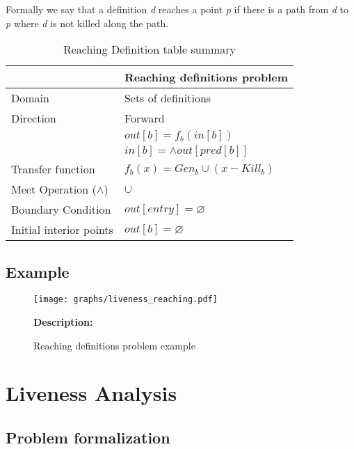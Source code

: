 \documentclass{article}
\begin{document}
Formally we say that a definition \textit{d} reaches a point \textit{p} if there is a path from \textit{d} to \textit{p} where \textit{d} is not killed along the path.

\begin{table}[H]
\centering
\begin{tabular}{|p{}|p{}|}
\hline
 & \textbf{Reaching definitions problem} \\
\hline
Domain & Sets of definitions \\
\hline
Direction & Forward \\
 & $out[b] = f_b(in[b])$ \\
 & $in[b] = \wedge out[pred[b]]$ \\
\hline
Transfer function & $f_b(x) = Gen_b \cup (x - Kill_b)$ \\
\hline
Meet Operation ($\wedge$) & $\cup$ \\
\hline
Boundary Condition & $out[entry] = \varnothing$  \\
\hline
Initial interior points & $out[b] = \varnothing$  \\
\hline
\end{tabular}
\caption{Reaching Definition table summary}
\label{tab:dataflow_problem_x}
\end{table}

\subsection{Example}

\begin{figure}[H]
    \centering
    \begin{minipage}{0.45\textwidth}
        \texttt{[image: graphs/liveness\_reaching.pdf]}
    \end{minipage}%
    \begin{minipage}{0.45\textwidth}
        \textbf{Description:} 
    \end{minipage}
    \caption{Reaching definitions problem example}
\end{figure}
\section{Liveness Analysis}

\subsection{Problem formalization}
\end{document}
